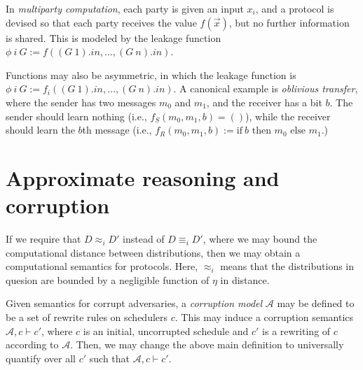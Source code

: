 \documentclass{article}
\begin{document}
In \emph{multiparty computation}, each party is given an input $x_i$, and a protocol is devised so that each party receives the value $f(\vec{x})$, but no further information is shared. This is modeled by the leakage function $\phi\ i\ G := f((G\ 1).in, \dots, (G\ n).in)$.

Functions may also be asymmetric, in which the leakage function is $\phi\ i\ G := f_i((G\ 1).in, \dots, (G\ n).in)$. A canonical example is \emph{oblivious transfer}, where the sender has two messages $m_0$ and $m_1$, and the receiver has a bit $b$. The sender should learn nothing (i.e., $f_S (m_0, m_1, b) = ()$), while the receiver should learn the $b$th message (i.e., $f_R (m_0, m_1, b) := \text{if}\ b \text{ then } m_0 \text{ else } m_1.$)


\section{Approximate reasoning and corruption}

If we require that $D \approx_i D'$ instead of $D \equiv_i D'$, where we may bound the computational distance between distributions, then we may obtain a computational semantics for protocols. Here, $\approx_i$ means that the distributions in quesion are bounded by a negligible function of $\eta$ in distance. 

Given semantics for corrupt adversaries, a \emph{corruption model} $\mathcal{A}$ may be defined to be a set of rewrite rules on schedulers $c$. This may induce a corruption semantics $\mathcal{A}, c \vdash c'$, where $c$ is an initial, uncorrupted schedule and $c'$ is a rewriting of $c$ according to $\mathcal{A}$. Then, we may change the above main definition to universally quantify over all $c'$ such that $\mathcal{A}, c \vdash c'$.
\end{document}
